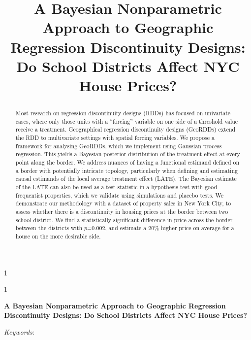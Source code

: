 \documentclass[12pt]{article}
\newcommand{\blind}{1}
\newcommand{\georddtitle}{
    A Bayesian Nonparametric Approach to Geographic Regression Discontinuity Designs:
    Do School Districts Affect NYC House Prices?
}
\begin{document}
\doublespacing



\blind
{
\title{
    \Large
    \bf
    \georddtitle
}
\author{\georddauthor}
\maketitle
} \fi

\blind
{
  \bigskip
  \bigskip
  \bigskip
  \begin{center}
    {\LARGE\bf \georddtitle}
\end{center}
  \medskip
} \fi
\begin{abstract}
    Most research on regression discontinuity designs (RDDs) has focused on univariate cases, where only those units with a ``forcing'' variable on one side of a threshold value receive a treatment.
    Geographical regression discontinuity designs (GeoRDDs) extend the RDD to multivariate settings with spatial forcing variables.
    We propose a framework for analysing GeoRDDs, which we implement using Gaussian process regression. 
    This yields a Bayesian posterior distribution of the treatment effect at every point along the border.
    We address nuances of having a functional estimand defined on a border with potentially intricate topology, particularly when defining and estimating causal estimands of the local average treatment effect (LATE).
    The Bayesian estimate of the LATE can also be used as a test statistic
    in a hypothesis test with good frequentist properties, 
    which we validate using simulations and placebo tests.
    We demonstrate our methodology with a dataset of property sales in New York City,
    to assess whether there is a discontinuity in housing prices at the border between two school district.
    We find a statistically significant difference in price across the border between the districts with \(p\)=0.002, and estimate a 20\%  higher price on average for a house on the more desirable side.
\end{abstract}

\noindent%
{\it Keywords}: \georddkeywords
\vfill
\newpage


\end{document}
